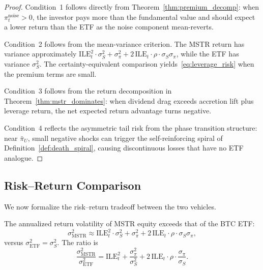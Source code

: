 \begin{proof}
Condition~1 follows directly from Theorem~\ref{thm:premium_decomp}: when $\pi_t^{\mathrm{noise}} > 0$, the investor pays more than the fundamental value and should expect a lower return than the ETF as the noise component mean-reverts.

Condition~2 follows from the mean-variance criterion. The MSTR return has variance approximately $\mathrm{ILE}_t^2 \cdot \sigma_S^2 + \sigma_\pi^2 + 2\,\mathrm{ILE}_t \cdot \rho \cdot \sigma_S \sigma_\pi$, while the ETF has variance $\sigma_S^2$. The certainty-equivalent comparison yields~\eqref{eq:leverage_risk} when the premium terms are small.

Condition~3 follows from the return decomposition in Theorem~\ref{thm:mstr_dominates}: when dividend drag exceeds accretion lift plus leverage return, the net expected return advantage turns negative.

Condition~4 reflects the asymmetric tail risk from the phase transition structure: near $\bar{\pi}_U$, small negative shocks can trigger the self-reinforcing spiral of Definition~\ref{def:death_spiral}, causing discontinuous losses that have no ETF analogue.
\end{proof}

\subsection{Risk--Return Comparison}
\label{subsec:risk_return}

We now formalize the risk--return tradeoff between the two vehicles.

\begin{proposition}
\label{prop:vol_comparison}
The annualized return volatility of MSTR equity exceeds that of the BTC ETF:
\begin{equation}
\label{eq:vol_mstr}
  \sigma_{\mathrm{MSTR}}^2 \approx \mathrm{ILE}_t^2 \cdot \sigma_S^2 + \sigma_\pi^2 + 2\,\mathrm{ILE}_t \cdot \rho \cdot \sigma_S \sigma_\pi,
\end{equation}
versus $\sigma_{\mathrm{ETF}}^2 = \sigma_S^2$. The ratio is
\begin{equation}
\label{eq:vol_ratio}
  \frac{\sigma_{\mathrm{MSTR}}^2}{\sigma_{\mathrm{ETF}}^2} = \mathrm{ILE}_t^2 + \frac{\sigma_\pi^2}{\sigma_S^2} + 2\,\mathrm{ILE}_t \cdot \rho \cdot \frac{\sigma_\pi}{\sigma_S}.
\end{equation}
\end{proposition}

